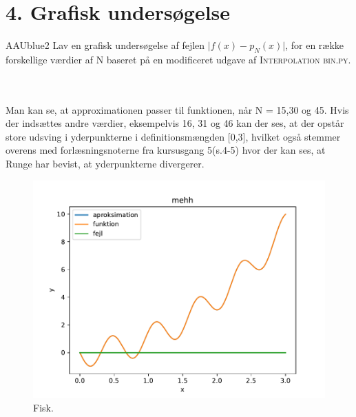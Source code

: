\section*{4. Grafisk undersøgelse}
%
\begin{color}{AAUblue2} 
Lav en grafisk undersøgelse af fejlen $\lvert f(x)-p_N(x) \rvert$, for en række forskellige værdier af N baseret på en modificeret udgave af \textsc{Interpolation bin.py.}
\end{color}
\\\\
Man kan se, at approximationen passer til funktionen, når N = 15,30 og 45. Hvis der indsættes andre værdier, eksempelvis 16, 31 og 46 kan der ses, at der opstår store udsving i yderpunkterne i definitionsmængden [0,3], hvilket også stemmer overens med forlæsningsnoterne fra kursusgang 5(s.4-5) hvor der kan ses, at Runge har bevist, at yderpunkterne divergerer.
%
\begin{figure}[h!]
\begin{center}
\includegraphics[scale=0.9]{code/del2}
\end{center}
\caption{Fisk.}
%
\end{figure} 

